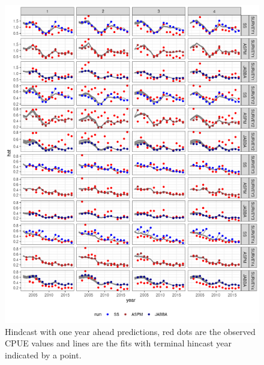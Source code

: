 \documentclass[a4paper]{article}
\begin{document}
\begin{figure}[htbp]
\centering
\includegraphics[width=6in]{final-hy-plot-1.png}
\caption{Hindcast with one year ahead predictions, red dots are the observed CPUE values and lines are the fits with terminal hincast year indicated by a point.}
\label{fig:hy1}
\end{figure}
\end{document}
